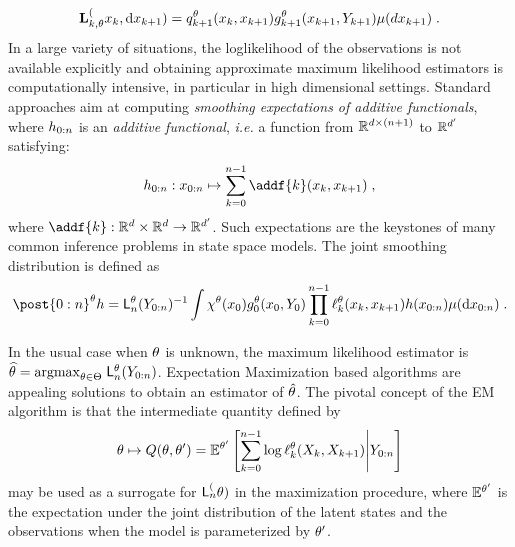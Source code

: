 \documentclass{article}
\begin{document}
$$
\mathbf{L}_{k,\theta}^{(}x_k, \mathrm{d} x_{k+ 1})  = q_{k+1}^{\theta}(x_{k}, x_{k+1})g_{k+1}^{\theta}(x_{k+1},Y_{k+1})\mu(dx_{k+1})\;.
$$
In a large variety of situations, the loglikelihood of the observations is not available explicitly and obtaining approximate maximum likelihood estimators is computationally intensive, in particular in high dimensional settings. Standard approaches  aim at computing \textit{smoothing expectations of additive functionals},  where $h_{0:n}$ is an \textit{additive functional}, \textit{i.e.} a function from $\mathbb{R}^{d \times (n + 1)}$ to $\mathbb{R}^{d'}$ satisfying:
\begin{equation}
\label{eq:additive:functional}
\af{0:n}: x_{0:n} \mapsto \sum_{k=0}^{n-1}\addf{k}(x_{k},x_{k+1})\eqsp,
\end{equation}
where $\addf{k}:\rset^{d} \times \rset^{d}\to\rset^{d'}$.
Such expectations are the keystones of many common inference problems in state space models. The joint smoothing distribution is defined as
$$
\post{0:n}^{\parvec} h = \llh{n}{\parvec}(Y_{0:n})^{-1} \int \chi^\parvec(x_0)\md{0}{\parvec}(x_{0},Y_{0})\prod_{k=0}^{n-1}\qg{k}{\parvec}(x_{k},x_{k+1})h(x_{0:n})\mu(\rmd x_{0:n})\eqsp.
$$

\begin{example}[EM algorithm.]
\label{ex:em:algorithm}
In the usual case when $\theta$ is unknown, the maximum likelihood estimator is $\widehat {\theta} = \mathrm{argmax}_{\theta\in\Theta}\;\mathsf{L}_{n}^{\theta}(Y_{0:n})$. Expectation Maximization based algorithms are appealing solutions to obtain an estimator of $\hat {\theta}$.
The pivotal concept of the EM algorithm is that the intermediate quantity defined by
\begin{equation*}
\theta\mapsto Q(\theta,\theta') = \mathbb{E}^{\theta'}\left[\sum_{k=0}^{n-1} \log \ell_{k}^{\theta}(X_{k}, X_{k+1})\middle | Y_{0:n}\right] 
\end{equation*}
may be used as a surrogate for $\mathsf{L}_{n}^{(}\theta)$ in the maximization procedure,  where $\mathbb{E}^{\theta'}$ is the expectation under the joint distribution of the latent states and the observations when the model is parameterized by $\theta'$. 
\end{example}
\end{document}
